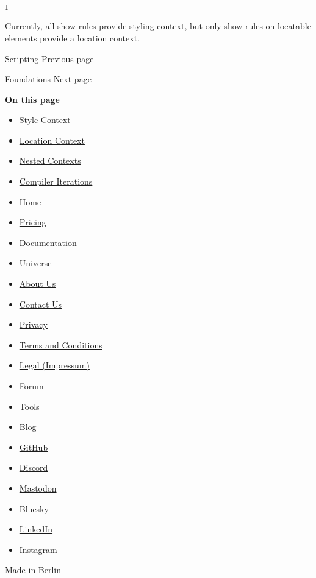 \label{1}
\textsuperscript{1}

Currently, all show rules provide styling context, but only show rules
on \href{/docs/reference/introspection/location/\#locatable}{locatable}
elements provide a location context.

\href{/docs/reference/scripting/}{\pandocbounded{}}

{ Scripting } { Previous page }

\href{/docs/reference/foundations/}{\pandocbounded{}}

{ Foundations } { Next page }

\textbf{On this page}

\begin{itemize}
\tightlist
\item
  \hyperref[style-context]{Style Context}
\item
  \hyperref[location-context]{Location Context}
\item
  \hyperref[nested-contexts]{Nested Contexts}
\item
  \hyperref[compiler-iterations]{Compiler Iterations}
\end{itemize}

\begin{itemize}
\tightlist
\item
  \href{/}{Home}
\item
  \href{/pricing/}{Pricing}
\item
  \href{/docs/}{Documentation}
\item
  \href{/universe/}{Universe}
\item
  \href{/about/}{About Us}
\item
  \href{/contact/}{Contact Us}
\item
  \href{/privacy/}{Privacy}
\item
  \href{https://typst.app/terms}{Terms and Conditions}
\item
  \href{/legal/}{Legal (Impressum)}
\end{itemize}

\begin{itemize}
\tightlist
\item
  \href{https://forum.typst.app}{Forum}
\item
  \href{/tools/}{Tools}
\item
  \href{/blog/}{Blog}
\item
  \href{https://github.com/typst/}{GitHub}
\item
  \href{https://discord.gg/2uDybryKPe}{Discord}
\item
  \href{https://mastodon.social/@typst}{Mastodon}
\item
  \href{https://bsky.app/profile/typst.app}{Bluesky}
\item
  \href{https://www.linkedin.com/company/typst/}{LinkedIn}
\item
  \href{https://instagram.com/typstapp/}{Instagram}
\end{itemize}

Made in Berlin
